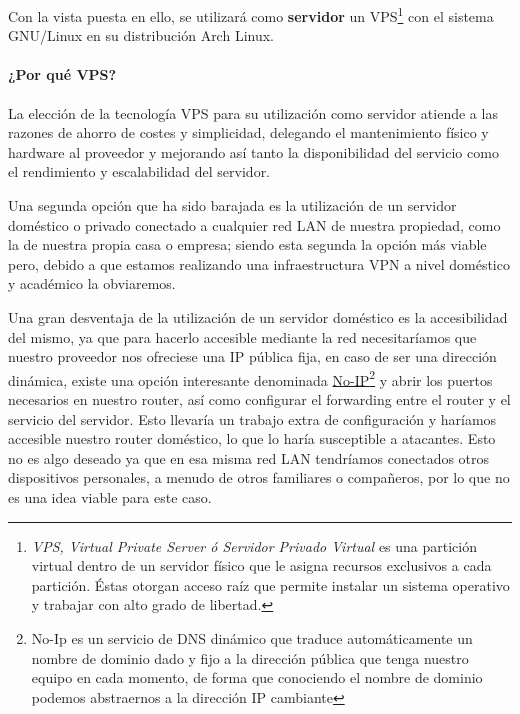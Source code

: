 \documentclass[a4paper, 11pt, titlepage]{article}
\begin{document}
        Con la vista puesta en ello, se utilizará como \textbf{servidor} un VPS\footnote{
            \textit{VPS, Virtual Private Server ó Servidor Privado Virtual} es una partición virtual dentro 
            de un servidor físico que le asigna recursos exclusivos a cada partición. Éstas otorgan acceso 
            raíz que permite instalar un sistema operativo y trabajar con alto grado de libertad.
        } con el sistema GNU/Linux en su distribución Arch Linux.

        \paragraph{¿Por qué VPS?} La elección de la tecnología VPS para su utilización como servidor 
        atiende a las razones de ahorro de costes y simplicidad, delegando el mantenimiento físico y 
        hardware al proveedor y mejorando así tanto la disponibilidad del servicio como el rendimiento 
        y escalabilidad del servidor.

        Una segunda opción que ha sido barajada es la utilización de un servidor doméstico o privado
        conectado a cualquier red LAN de nuestra propiedad, como la de nuestra propia casa o empresa; 
        siendo esta segunda la opción más viable pero, debido a que estamos realizando una infraestructura
        VPN a nivel doméstico y académico la obviaremos.

        Una gran desventaja de la utilización de un servidor doméstico es la accesibilidad del mismo, ya
        que para hacerlo accesible mediante la red necesitaríamos que nuestro proveedor nos ofreciese una IP
        pública fija, en caso de ser una dirección dinámica, existe una opción interesante denominada 
        \href{https://www.noip.com/}{No-IP}\footnote{No-Ip es un servicio de DNS dinámico que traduce automáticamente un nombre de dominio dado y 
        fijo a la dirección pública que tenga nuestro equipo en cada momento, de forma que conociendo el nombre de dominio podemos 
        abstraernos a la dirección IP cambiante} y abrir los puertos necesarios en nuestro router, así como configurar el forwarding 
        entre el router y el servicio del servidor. Esto llevaría un trabajo extra de configuración y haríamos accesible nuestro router 
        doméstico, lo que lo haría susceptible a atacantes. Esto no es algo deseado ya que en esa misma red LAN tendríamos conectados otros 
        dispositivos personales, a menudo de otros familiares o compañeros, por lo que no es una idea viable para este caso.
\end{document}
